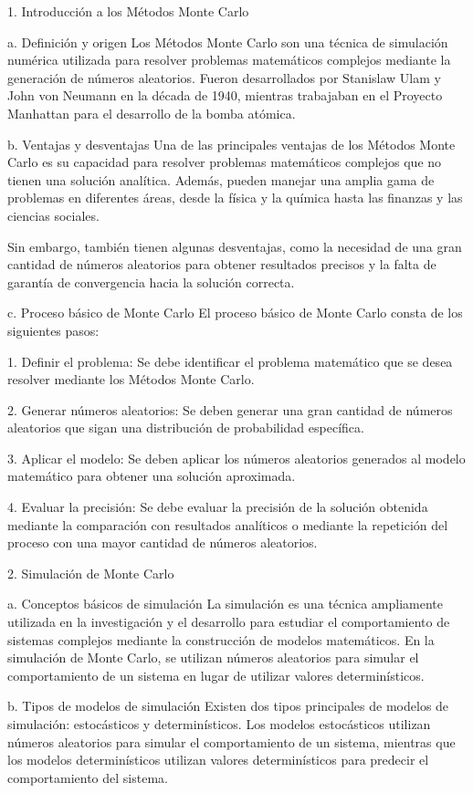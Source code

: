 

1. Introducción a los Métodos Monte Carlo

a. Definición y origen
Los Métodos Monte Carlo son una técnica de simulación numérica utilizada para resolver problemas matemáticos complejos mediante la generación de números aleatorios. Fueron desarrollados por Stanislaw Ulam y John von Neumann en la década de 1940, mientras trabajaban en el Proyecto Manhattan para el desarrollo de la bomba atómica.

b. Ventajas y desventajas
Una de las principales ventajas de los Métodos Monte Carlo es su capacidad para resolver problemas matemáticos complejos que no tienen una solución analítica. Además, pueden manejar una amplia gama de problemas en diferentes áreas, desde la física y la química hasta las finanzas y las ciencias sociales.

Sin embargo, también tienen algunas desventajas, como la necesidad de una gran cantidad de números aleatorios para obtener resultados precisos y la falta de garantía de convergencia hacia la solución correcta.

c. Proceso básico de Monte Carlo
El proceso básico de Monte Carlo consta de los siguientes pasos:

1. Definir el problema: Se debe identificar el problema matemático que se desea resolver mediante los Métodos Monte Carlo.

2. Generar números aleatorios: Se deben generar una gran cantidad de números aleatorios que sigan una distribución de probabilidad específica.

3. Aplicar el modelo: Se deben aplicar los números aleatorios generados al modelo matemático para obtener una solución aproximada.

4. Evaluar la precisión: Se debe evaluar la precisión de la solución obtenida mediante la comparación con resultados analíticos o mediante la repetición del proceso con una mayor cantidad de números aleatorios.

2. Simulación de Monte Carlo

a. Conceptos básicos de simulación
La simulación es una técnica ampliamente utilizada en la investigación y el desarrollo para estudiar el comportamiento de sistemas complejos mediante la construcción de modelos matemáticos. En la simulación de Monte Carlo, se utilizan números aleatorios para simular el comportamiento de un sistema en lugar de utilizar valores determinísticos.

b. Tipos de modelos de simulación
Existen dos tipos principales de modelos de simulación: estocásticos y determinísticos. Los modelos estocásticos utilizan números aleatorios para simular el comportamiento de un sistema, mientras que los modelos determinísticos utilizan valores determinísticos para predecir el comportamiento del sistema.

